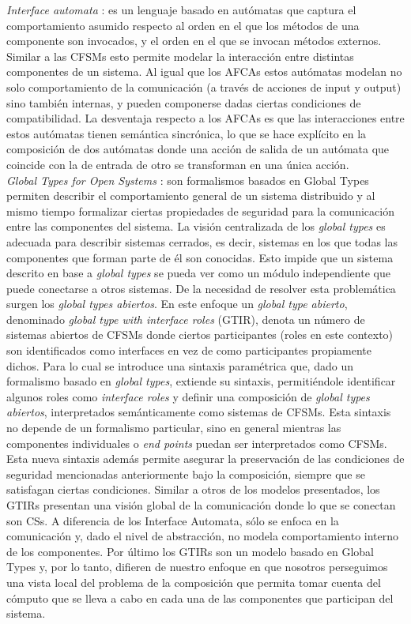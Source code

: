 \emph{Interface automata} \cite{dealfaro:esec-fse-01}: es un lenguaje basado en autómatas que captura el comportamiento asumido respecto al orden en el que los métodos de una componente son invocados, y el orden en el que se invocan métodos externos. Similar a las CFSMs esto permite modelar la interacción entre distintas componentes de un sistema. Al igual que los AFCAs estos autómatas modelan no solo comportamiento de la comunicación (a través de acciones de input y output) sino también internas, y pueden componerse dadas ciertas condiciones de compatibilidad. La desventaja respecto a los AFCAs es que las interacciones entre estos autómatas tienen semántica sincrónica, lo que se hace explícito en la composición de dos autómatas donde una acción de salida de un autómata que coincide con la de entrada de otro se transforman en una única acción.\\

\emph{Global Types for Open Systems} \cite{barbanera:eptcs279}: son formalismos basados en Global Types permiten describir el comportamiento general de un sistema distribuido y al mismo tiempo formalizar ciertas propiedades de seguridad para la comunicación entre las componentes del sistema. La visión centralizada de los \emph{global types} es adecuada para describir sistemas cerrados, es decir, sistemas en los que todas las componentes que forman parte de él son conocidas. Esto impide que un sistema descrito en base a \emph{global types} se pueda ver como un módulo independiente que puede conectarse a otros sistemas. De la necesidad de resolver esta problemática surgen los \emph{global types abiertos}. En este enfoque un \emph{global type abierto}, denominado \emph{global type with interface roles} (GTIR), denota un número de sistemas abiertos de CFSMs donde ciertos participantes (roles en este contexto) son identificados como interfaces en vez de como participantes propiamente dichos. Para lo cual se introduce una sintaxis paramétrica que, dado un formalismo basado en \emph{global types}, extiende su sintaxis, permitiéndole identificar algunos roles como \emph{interface roles} y definir una composición de \emph{global types abiertos}, interpretados semánticamente como sistemas de CFSMs. Esta sintaxis no depende de un formalismo particular, sino en general mientras las componentes individuales o \emph{end points} puedan ser interpretados como CFSMs. Esta nueva sintaxis además permite asegurar la preservación de las condiciones de seguridad mencionadas anteriormente bajo la composición, siempre que se satisfagan ciertas condiciones. Similar a otros de los modelos presentados, los GTIRs presentan una visión global de la comunicación donde lo que se conectan son CSs. A diferencia de los Interface Automata, sólo se enfoca en la comunicación y, dado el nivel de abstracción, no modela comportamiento interno de los componentes. Por último los GTIRs son un modelo basado en Global Types y, por lo tanto, difieren de nuestro enfoque en que nosotros perseguimos una vista local del problema de la composición que permita tomar cuenta del cómputo que se lleva a cabo en cada una de las componentes que participan del sistema. \\

